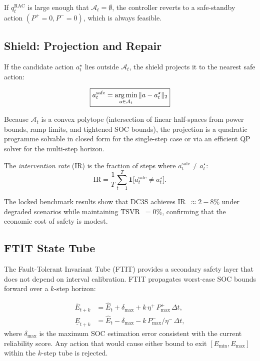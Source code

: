 If $q_t^{\mathrm{RAC}}$ is large enough that $\mathcal{A}_t = \emptyset$,
the controller reverts to a safe-standby action
$(P^{+} = 0, P^{-} = 0)$, which is always feasible.

\subsection{Shield: Projection and Repair}
\label{sec:shield}

If the candidate action $a_t^\star$ lies outside $\mathcal{A}_t$, the shield
projects it to the nearest safe action:

\begin{equation}
\label{eq:repair}
\boxed{
  a_t^{\mathrm{safe}} = \operatorname*{arg\,min}_{a \in \mathcal{A}_t}
    \|a - a_t^\star\|_2
}
\end{equation}

Because $\mathcal{A}_t$ is a convex polytope (intersection of linear
half-spaces from power bounds, ramp limits, and tightened SOC bounds), the
projection is a quadratic programme solvable in closed form for the
single-step case or via an efficient QP solver for the multi-step horizon.

The \emph{intervention rate} (IR) is the fraction of steps where
$a_t^{\mathrm{safe}} \neq a_t^\star$:
\[
  \mathrm{IR} = \frac{1}{T} \sum_{t=1}^{T}
    \mathbf{1}\!\bigl[a_t^{\mathrm{safe}} \neq a_t^\star\bigr].
\]

The locked benchmark results show that DC3S achieves IR~$\approx 2{-}8\%$
under degraded scenarios while maintaining TSVR~$= 0\%$, confirming that the
economic cost of safety is modest.

\subsection{FTIT State Tube}
\label{sec:ftit}

The Fault-Tolerant Invariant Tube (FTIT) provides a secondary safety layer
that does not depend on interval calibration.  FTIT propagates worst-case
SOC bounds forward over a $k$-step horizon:

\begin{equation}
\label{eq:ftit}
\begin{aligned}
  \overline{E}_{t+k} &= \hat{E}_t + \delta_{\max}
    + k\,\eta^{+}\,P_{\max}^{+}\,\Delta t, \\
  \underline{E}_{t+k} &= \hat{E}_t - \delta_{\max}
    - k\,P_{\max}^{-}/\eta^{-}\,\Delta t,
\end{aligned}
\end{equation}
where $\delta_{\max}$ is the maximum SOC estimation error consistent with
the current reliability score.  Any action that would cause either bound to
exit $[E_{\min}, E_{\max}]$ within the $k$-step tube is rejected.

